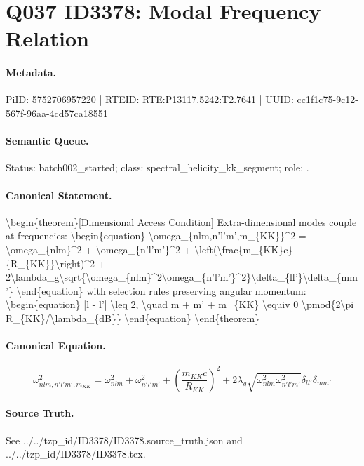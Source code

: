 \section*{Q037 ID3378: Modal Frequency Relation}
\paragraph{Metadata.}
PiID: 5752706957220 | RTEID: RTE:P13117.5242:T2.7641 | UUID: cc1f1c75-9c12-567f-96aa-4cd57ca18551

\paragraph{Semantic Queue.}
Status: batch002\_started; class: spectral\_helicity\_kk\_segment; role: .

\paragraph{Canonical Statement.}
\textbackslash{}begin\{theorem\}[Dimensional Access Condition] Extra-dimensional modes couple at frequencies: \textbackslash{}begin\{equation\} \textbackslash{}omega\_\{nlm,n'l'm',m\_\{KK\}\}\textasciicircum{}2 = \textbackslash{}omega\_\{nlm\}\textasciicircum{}2 + \textbackslash{}omega\_\{n'l'm'\}\textasciicircum{}2 + \textbackslash{}left(\textbackslash{}frac\{m\_\{KK\}c\}\{R\_\{KK\}\}\textbackslash{}right)\textasciicircum{}2 + 2\textbackslash{}lambda\_g\textbackslash{}sqrt\{\textbackslash{}omega\_\{nlm\}\textasciicircum{}2\textbackslash{}omega\_\{n'l'm'\}\textasciicircum{}2\}\textbackslash{}delta\_\{ll'\}\textbackslash{}delta\_\{mm'\} \textbackslash{}end\{equation\} with selection rules preserving angular momentum: \textbackslash{}begin\{equation\} |l - l'| \textbackslash{}leq 2, \textbackslash{}quad m + m' + m\_\{KK\} \textbackslash{}equiv 0 \textbackslash{}pmod\{2\textbackslash{}pi R\_\{KK\}/\textbackslash{}lambda\_\{dB\}\} \textbackslash{}end\{equation\} \textbackslash{}end\{theorem\}

\paragraph{Canonical Equation.}
\[
\begin{equation} \omega_{nlm,n'l'm',m_{KK}}^2 = \omega_{nlm}^2 + \omega_{n'l'm'}^2 + \left(\frac{m_{KK}c}{R_{KK}}\right)^2 + 2\lambda_g \sqrt{\omega_{nlm}^2 \omega_{n'l'm'}^2} \delta_{ll'}\delta_{mm'} \end{equation}
\]

\paragraph{Source Truth.}
See ../../tzp\_id/ID3378/ID3378.source\_truth.json and ../../tzp\_id/ID3378/ID3378.tex.
